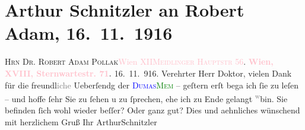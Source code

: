 

               \section[Arthur Schnitzler an Robert Adam, 16. 11. 1916]{ Arthur Schnitzler an Robert Adam, 16. 11. 1916}\nopagebreak{}\rehead{ }\normalsize\beginnumbering{} \toendnotes[C]{\smallbreak\pagebreak[2]} 
\toendnotes[C]{\smallbreak}\pstart{}{\pb}\textsc{Hrn Dr. Robert Adam Pollak}\pend{}\pstart{}\textcolor{pink}{Wien XII}{}\ledrightnote{\textcolor{pink}{XII., Meidling}}\pend{}\pstart{}\textcolor{pink}{\textsc{Meidlinger Hauptstr} 56}{}\ledrightnote{\textcolor{pink}{Meidlinger Hauptstraße}}.\pend{}{\bigskip}\pstart
           \noindent{}\centering{}{\pb}\textcolor{gray}{\textbf{\textcolor{pink}{Wien, XVIII, Sternwartestr. 71}{}\ledrightnote{\textcolor{pink}{Sternwartestraße}}.}}\pend
           \pstart
           \raggedleft{}{\pb}16. 11. 916.\pend
           \pstart
           Verehrter Herr Doktor, vielen Dank für die
                        freundl\textcolor{gray}{iche} Ueberſendg der \textcolor{blue}{\textsc{Dumas}}{}\ledrightnote{\textcolor{blue}{Alexandre père Dumas}}{ }\textcolor{green}{\textsc{Mem}}{} – geſtern erſt bega{\geminationn} ich ſie zu leſen – und
                    hoffe ſehr Sie zu ſehen u zu ſprechen, ehe ich zu Ende gelangt \substVorne{}\textsuperscript{\textcolor{gray}{w}}\substDazwischen{}bin\substHinten{}. Sie befinden ſich wohl wieder beſſer? Oder ganz gut? Dies und
                    aehnliches wünschend mit herzlichem Gruß Ihr\pend
           \pstart \spacefill\mbox{ArthurSchnitzler}\pend{}\endnumbering{}  
      